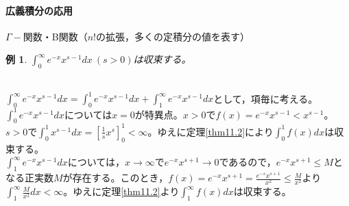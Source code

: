 \documentclass[dvipdfmx,a4j,10pt]{jsarticle}
\makeatletter
\theoremstyle{mystyle1}
\newtheorem{example}[dfn]{例}
\theoremstyle{mystyle2}
\renewenvironment{proof}[1][\proofname]{\par
  \pushQED{\qed}%
  \normalfont
  \topsep6\p@\@plus6\p@ \trivlist
  \item[\hskip\labelsep{\bfseries\sffamily #1}]\ignorespaces
}{%
  \popQED\endtrivlist\@endpefalse
}
\renewcommand\proofname{証明}
\makeatother
\begin{document}
\newpage

\paragraph{広義積分の応用}
$\Gamma-$関数・B関数（$n!$の拡張，多くの定積分の値を表す）
\begin{shaded}
\begin{example}\label{ex11.6}
$\displaystyle \int_0^\infty e^{-x} x^{s-1}dx\ (s>0)$は収束する。
\end{example}
\end{shaded}

\begin{proof}[例\ref{ex11.6}の証明]\
    \\
    $\displaystyle \int_0^\infty e^{-x} x^{s-1}dx = \int_0^1 e^{-x} x^{s-1}dx + \int_1^\infty e^{-x} x^{s-1}dx$として，項毎に考える。\\
    $\displaystyle \int_0^1 e^{-x} x^{s-1}dx$については$x=0$が特異点。$x>0$で$f(x)=e^{-x}x^{s-1}<x^{s-1}$。\\$s>0$で$\displaystyle\int_0^1 x^{s-1}dx=\left[\frac{1}{s}x^s\right]_0^1<\infty$。ゆえに定理\ref{thm11.2}により$\displaystyle \int_0^1 f(x)dx$は収束する。\\
    $\displaystyle \int_1^\infty e^{-x} x^{s-1}dx$については，$x\to\infty$で$e^{-x}x^{s+1}\to0$であるので，$e^{-x}x^{s+1}\leq M$となる正実数$M$が存在する。このとき，$\displaystyle f(x)=e^{-x}x^{s+1}=\frac{e^{-s}x^{s+1}}{x^2}\leq\frac{M}{x^2}$より$\displaystyle\int_1^\infty\frac{M}{x^2}dx<\infty$。ゆえに定理\ref{thm11.2}より$\displaystyle\int_1^\infty f(x)dx$は収束する。
\end{proof}
\end{document}
